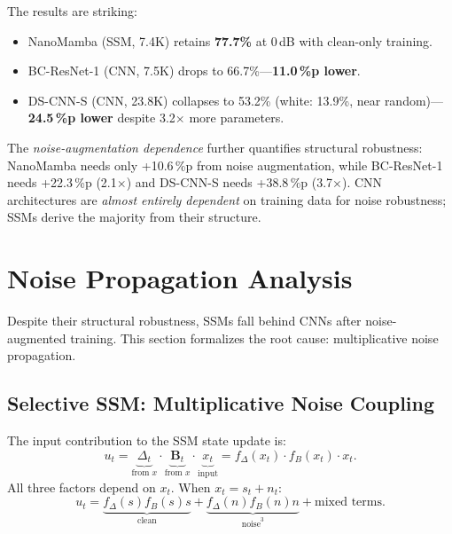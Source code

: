 \documentclass[journal]{IEEEtran}
\begin{document}
The results are striking:
\begin{itemize}
\setlength\itemsep{0pt}
\item NanoMamba (SSM, 7.4K) retains \textbf{77.7\%} at 0\,dB with clean-only training.
\item BC-ResNet-1 (CNN, 7.5K) drops to 66.7\%---\textbf{11.0\,\%p lower}.
\item DS-CNN-S (CNN, 23.8K) collapses to 53.2\% (white: 13.9\%, near random)---\textbf{24.5\,\%p lower} despite 3.2$\times$ more parameters.
\end{itemize}

The \emph{noise-augmentation dependence} further quantifies structural robustness: NanoMamba needs only +10.6\,\%p from noise augmentation, while BC-ResNet-1 needs +22.3\,\%p (2.1$\times$) and DS-CNN-S needs +38.8\,\%p (3.7$\times$).
CNN architectures are \emph{almost entirely dependent} on training data for noise robustness; SSMs derive the majority from their structure.


\section{Noise Propagation Analysis}
\label{sec:analysis}

Despite their structural robustness, SSMs fall behind CNNs after noise-augmented training.
This section formalizes the root cause: multiplicative noise propagation.

\subsection{Selective SSM: Multiplicative Noise Coupling}
\label{sec:mult_noise}

The input contribution to the SSM state update is:
\begin{equation}
u_t = \underbrace{\Delta_t}_{\text{from } x} \cdot \underbrace{\mathbf{B}_t}_{\text{from } x} \cdot \underbrace{x_t}_{\text{input}} = f_\Delta(x_t) \cdot f_B(x_t) \cdot x_t.
\label{eq:mult}
\end{equation}
All three factors depend on $x_t$. When $x_t = s_t + n_t$:
\begin{equation}
u_t = \underbrace{f_\Delta(s) f_B(s) s}_{\text{clean}} + \underbrace{f_\Delta(n) f_B(n) n}_{\text{noise}^3} + \text{mixed terms}.
\label{eq:cubic}
\end{equation}
\end{document}
